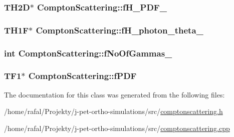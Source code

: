 \subsubsection[{\texorpdfstring{f\+H\+\_\+\+P\+D\+F\+\_\+}{fH_PDF_}}]{\setlength{\rightskip}{0pt plus 5cm}T\+H2D$\ast$ Compton\+Scattering\+::f\+H\+\_\+\+P\+D\+F\+\_\+\hspace{0.3cm}{\ttfamily [private]}}\hypertarget{classComptonScattering_aecd1718d8d180ff66e3a89f297f4458d}{}\label{classComptonScattering_aecd1718d8d180ff66e3a89f297f4458d}
\subsubsection[{\texorpdfstring{f\+H\+\_\+photon\+\_\+theta\+\_\+}{fH_photon_theta_}}]{\setlength{\rightskip}{0pt plus 5cm}T\+H1F$\ast$ Compton\+Scattering\+::f\+H\+\_\+photon\+\_\+theta\+\_\+\hspace{0.3cm}{\ttfamily [private]}}\hypertarget{classComptonScattering_ac2f4da687eadc32b94a80fe82f8e5a2b}{}\label{classComptonScattering_ac2f4da687eadc32b94a80fe82f8e5a2b}
\subsubsection[{\texorpdfstring{f\+No\+Of\+Gammas\+\_\+}{fNoOfGammas_}}]{\setlength{\rightskip}{0pt plus 5cm}int Compton\+Scattering\+::f\+No\+Of\+Gammas\+\_\+\hspace{0.3cm}{\ttfamily [private]}}\hypertarget{classComptonScattering_a7a0703c812fb29b0c80c251ae70ce0e9}{}\label{classComptonScattering_a7a0703c812fb29b0c80c251ae70ce0e9}
\subsubsection[{\texorpdfstring{f\+P\+DF}{fPDF}}]{\setlength{\rightskip}{0pt plus 5cm}T\+F1$\ast$ Compton\+Scattering\+::f\+P\+DF}\hypertarget{classComptonScattering_add23479fa60d3dab59f9baa2d2dcf76f}{}\label{classComptonScattering_add23479fa60d3dab59f9baa2d2dcf76f}


The documentation for this class was generated from the following files\+:\begin{DoxyCompactItemize}
\item 
/home/rafal/\+Projekty/j-\/pet-\/ortho-\/simulations/src/\hyperlink{comptonscattering_8h}{comptonscattering.\+h}\item 
/home/rafal/\+Projekty/j-\/pet-\/ortho-\/simulations/src/\hyperlink{comptonscattering_8cpp}{comptonscattering.\+cpp}\end{DoxyCompactItemize}
